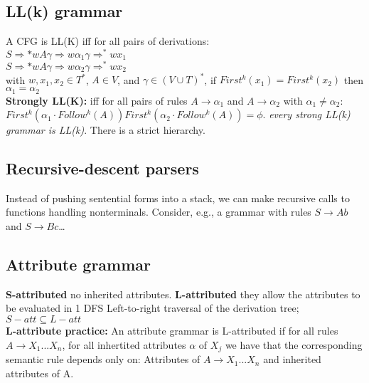 \subsection*{LL(k) grammar}
A CFG is LL(K) iff for all pairs of derivations:\\
$S \Rightarrow* wA\gamma \Rightarrow w\alpha_1\gamma \Rightarrow^* wx_1$\\
$S \Rightarrow* wA\gamma \Rightarrow w\alpha_2\gamma \Rightarrow^* wx_2$\\
with $w,x_1,x_2\in T^*$, $A \in V$, and $\gamma \in (V \cup T)^*$, if $First^k(x_1) = First^k(x_2)$ then $\alpha_1 = \alpha_2$\\
\textbf{Strongly LL(K):} iff for all pairs of rules $A \rightarrow \alpha_1$ and $A \rightarrow \alpha_2$ with $\alpha_1 \neq \alpha_2$: $First^k(\alpha_1\cdot Follow^k(A))$$First^k(\alpha_2\cdot Follow^k(A))$$=\phi$. \textit{every strong LL(k) grammar is LL(k)}. There is a strict hierarchy.
		\subsection*{Recursive-descent parsers}
		Instead of pushing sentential forms into a stack, we can make recursive
		calls to functions handling nonterminals. Consider, e.g., a grammar with rules $S \rightarrow Ab$ and $S \rightarrow Bc$\ldots
		\subsection*{Attribute grammar}
		\textbf{S-attributed} no inherited attributes. \textbf{L-attributed} they allow the attributes to be evaluated in 1 DFS Left-to-right traversal of the derivation tree; $S-att \subseteq L-att$\\
		\textbf{L-attribute practice:} An attribute grammar is L-attributed if for all rules $A \rightarrow X_1...X_n$, for all inhertited attributes $\alpha$ of $X_j$ we have that the corresponding semantic rule depends only on: Attributes of $A \rightarrow X_1...X_n$ and inherited attributes of A.
